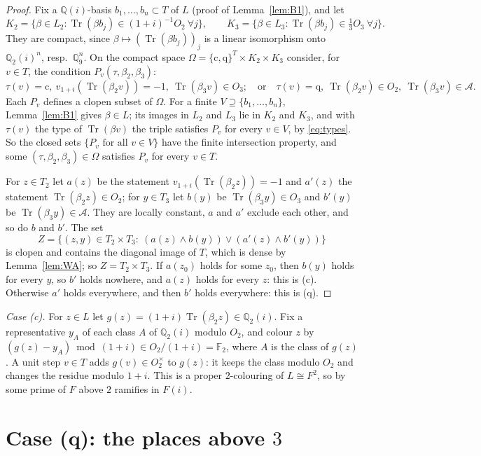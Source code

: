 \documentclass[11pt,a4paper]{amsart}
\theoremstyle{remark}
\newcommand{\Q}{\mathbb{Q}}
\newcommand{\F}{\mathbb{F}}
\newcommand{\Tr}{\operatorname{Tr}}
\newcommand{\cA}{\mathcal{A}}
\begin{document}
\begin{proof}
Fix a $\Q(i)$-basis $b_1,\dots,b_n\subset T$ of $L$ (proof of Lemma~\ref{lem:B1}), and let
\[
K_2=\{\beta\in L_2:\Tr(\beta b_j)\in(1+i)^{-1}O_2\ \forall j\},\qquad K_3=\{\beta\in L_3:\Tr(\beta b_j)\in\tfrac13O_3\ \forall j\}.
\]
They are compact, since $\beta\mapsto(\Tr(\beta b_j))_j$ is a linear isomorphism onto $\Q_2(i)^n$, resp.\
$\Q_9^n$. On the compact space $\Omega=\{\mathrm c,\mathrm q\}^T\times K_2\times K_3$ consider, for $v\in T$, the
condition $P_v(\tau,\beta_2,\beta_3)$:
\[
\tau(v)=\mathrm c,\ v_{1+i}(\Tr(\beta_2v))=-1,\ \Tr(\beta_3v)\in O_3;\quad\text{or}\quad
\tau(v)=\mathrm q,\ \Tr(\beta_2v)\in O_2,\ \Tr(\beta_3v)\in\cA.
\]
Each $P_v$ defines a clopen subset of $\Omega$. For a finite $V\supseteq\{b_1,\dots,b_n\}$, Lemma~\ref{lem:B1} gives
$\beta\in L$; its images in $L_2$ and $L_3$ lie in $K_2$ and $K_3$, and with $\tau(v)$ the type of $\Tr(\beta v)$ the
triple satisfies $P_v$ for every $v\in V$, by \eqref{eq:types}. So the closed sets $\{P_v\text{ for all }v\in V\}$
have the finite intersection property, and some $(\tau,\beta_2,\beta_3)\in\Omega$ satisfies $P_v$ for every $v\in T$.

For $z\in T_2$ let $a(z)$ be the statement $v_{1+i}(\Tr(\beta_2z))=-1$ and $a'(z)$ the statement
$\Tr(\beta_2z)\in O_2$; for $y\in T_3$ let $b(y)$ be $\Tr(\beta_3y)\in O_3$ and $b'(y)$ be $\Tr(\beta_3y)\in\cA$.
They are locally constant, $a$ and $a'$ exclude each other, and so do $b$ and $b'$. The set
\[
Z=\{(z,y)\in T_2\times T_3:\ (a(z)\wedge b(y))\vee(a'(z)\wedge b'(y))\}
\]
is clopen and contains the diagonal image of $T$, which is dense by Lemma~\ref{lem:WA}; so $Z=T_2\times T_3$. If
$a(z_0)$ holds for some $z_0$, then $b(y)$ holds for every $y$, so $b'$ holds nowhere, and $a(z)$ holds for every
$z$: this is (c). Otherwise $a'$ holds everywhere, and then $b'$ holds everywhere: this is (q).
\end{proof}

\emph{Case (c).} For $z\in L$ let $g(z)=(1+i)\Tr(\beta_2z)\in\Q_2(i)$. Fix a representative $y_A$ of each class $A$
of $\Q_2(i)$ modulo $O_2$, and colour $z$ by $(g(z)-y_A)\bmod(1+i)\in O_2/(1+i)=\F_2$, where $A$ is the class of
$g(z)$. A unit step $v\in T$ adds $g(v)\in O_2^\times$ to $g(z)$: it keeps the class modulo $O_2$ and
changes the residue modulo $1+i$. This is a proper $2$-colouring of $L\cong F^2$, so by \cite[Theorem~1]{TC} some
prime of $F$ above $2$ ramifies in $F(i)$.

\section{Case (q): the places above \texorpdfstring{$3$}{3}}\label{sec:three}
\end{document}
